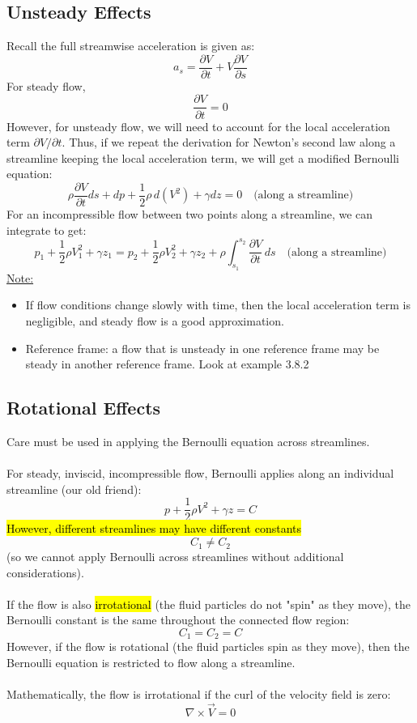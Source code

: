 ﻿\documentclass[12pt]{article}
\begin{document}
\subsection*{Unsteady Effects}
Recall the full streamwise acceleration is given as:
\[a_s = \frac{\partial V}{\partial t} + V \frac{\partial V}{\partial s}\]
For steady flow,
\[\frac{\partial V}{\partial t} = 0\]
However, for unsteady flow, we will need to account for the local acceleration term $\partial V/\partial t$. Thus, if we repeat the derivation for Newton's second law along a streamline keeping the local acceleration term, we will get a modified Bernoulli equation:
\[\rho \frac{\partial V}{\partial t} ds + dp+\frac{1}{2}\rho\,d(V^2)+ \gamma dz = 0 \quad \text{(along a streamline)}\]
For an incompressible flow between two points along a streamline, we can integrate to get:
\[p_1 + \frac{1}{2}\rho V_1^2 + \gamma z_1 = p_2 + \frac{1}{2} \rho V_2^2 + \gamma z_2+ \rho \int_{s_1}^{s_2} \frac{\partial V}{\partial t} \,ds  \quad \text{(along a streamline)}\]
\underline{Note:} 
\begin{itemize}
    \item If flow conditions change slowly with time, then the local acceleration term is negligible, and steady flow is a good approximation.
    \item Reference frame: a flow that is unsteady in one reference frame may be steady in another reference frame. Look at example 3.8.2 
\end{itemize}
\subsection*{Rotational Effects}
Care must be used in applying the Bernoulli equation across streamlines.\\\\
For steady, inviscid, incompressible flow, Bernoulli applies along an individual streamline (our old friend):
\[p + \frac{1}{2}\rho V^2 + \gamma z = C\]
\hl{However, different streamlines may have different constants}
\[C_1 \neq C_2\]
(so we cannot apply Bernoulli across streamlines without additional considerations).\\\\
If the flow is also \hl{irrotational} (the fluid particles do not "spin" as they move), the Bernoulli constant is the same throughout the connected flow region:
\[C_1 = C_2=C\]
However, if the flow is rotational (the fluid particles spin as they move), then the Bernoulli equation is restricted to flow along a streamline.\\\\
Mathematically, the flow is irrotational if the curl of the velocity field is zero:
\[\nabla \times \vec{V} = 0\]
\end{document}
